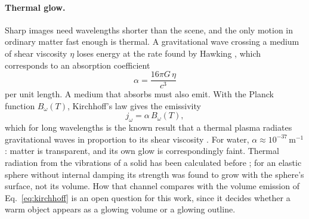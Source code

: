 \paragraph{Thermal glow.} Sharp images need wavelengths shorter than the
scene, and the only motion in ordinary matter fast enough is thermal. A
gravitational wave crossing a medium of shear viscosity $\eta$ loses energy at
the rate found by Hawking \cite{Hawking1966}, which corresponds to an
absorption coefficient
\begin{equation}\label{eq:alpha}
\alpha = \frac{16\pi G\,\eta}{c^{3}}
\end{equation}
per unit length. A medium that absorbs must also emit. With the Planck
function $B_\omega(T)$, Kirchhoff's law gives the emissivity
\begin{equation}\label{eq:kirchhoff}
j_\omega = \alpha\, B_\omega(T),
\end{equation}
which for long wavelengths is the known result that a thermal plasma radiates
gravitational waves in proportion to its shear viscosity
\cite{GhiglieriLaine2015}. For water, $\alpha \approx 10^{-37}\,\mathrm{m^{-1}}$:
matter is transparent, and its own glow is correspondingly faint. Thermal
radiation from the vibrations of a solid has been calculated before
\cite{SchaeferDehnen1981,DehnenRomeroSchaefer1984}; for an elastic sphere
without internal damping its strength was found to grow with the sphere's
surface, not its volume. How that channel compares with the volume emission of
Eq.~\eqref{eq:kirchhoff} is an open question for this work, since it decides
whether a warm object appears as a glowing volume or a glowing outline.
